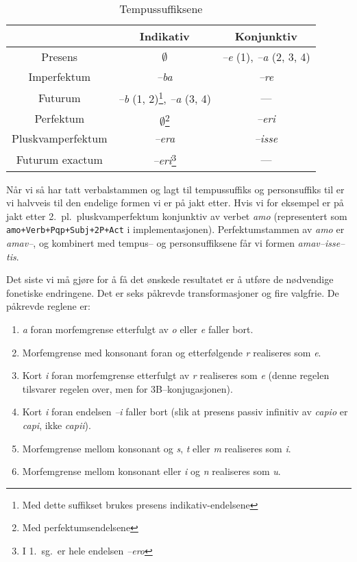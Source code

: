 \documentclass[a4paper]{article}
\begin{document}
\begin{savenotes}
\begin{table}[hp]
\begin{center}
\begin{tabular}{|c|c|c|}
    \hline
                  & Indikativ   & Konjunktiv \\
    \hline
Presens           & $\emptyset$ & \emph{--e} (1), \emph{--a} (2, 3, 4) \\
Imperfektum       & \emph{--ba} & \emph{--re} \\
Futurum           & \emph{--b} (1, 2)\footnote{Med dette suffikset brukes
presens indikativ-endelsene}, \emph{--a} (3, 4) & --- \\
    \hline
Perfektum         & $\emptyset$\footnote{Med perfektumsendelsene} & \emph{--eri} \\
Pluskvamperfektum & \emph{--era} & \emph{--isse} \\
Futurum exactum   & \emph{--eri}\footnote{I 1.~sg.~er hele endelsen
\emph{--ero}} & ---        \\
    \hline
\end{tabular}
\caption{Tempussuffiksene}
\label{tempus}
\end{center}
\end{table}
\end{savenotes}

N\aa{}r vi s\aa{} har tatt verbalstammen og lagt til tempussuffiks og
personsuffiks til er vi halvveis til den endelige formen vi er p\aa{} jakt
etter. Hvis vi for eksempel er p\aa{} jakt etter 2.~pl.~pluskvamperfektum
konjunktiv av verbet \emph{amo} (representert som
\texttt{amo+Verb+Pqp+Subj+2P+Act} i implementasjonen). Perfektumstammen av
\emph{amo} er \emph{amav--}, og kombinert med tempus-- og personsuffiksene
f\aa{}r vi formen \emph{amav--isse--tis}.

Det siste vi m\aa{} gj\o{}re for \aa{} f\aa{} det \o{}nskede resultatet er
\aa{} utf\o{}re de n\o{}dvendige fonetiske endringene. Det er seks
p\aa{}krevde transformasjoner og fire valgfrie. De p\aa{}krevde reglene er:
\begin{enumerate}
\item \emph{a} foran morfemgrense etterfulgt av \emph{o} eller \emph{e} faller
bort.

\item Morfemgrense med konsonant foran og etterf\o{}lgende \emph{r} realiseres
som \emph{e}.

\item Kort \emph{i} foran morfemgrense etterfulgt av \emph{r} realiseres som
\emph{e} (denne regelen tilsvarer regelen over, men for 3B--konjugasjonen).

\item Kort \emph{i} foran endelsen \emph{--i} faller bort (slik at presens
passiv infinitiv av \emph{capio} er \emph{capi}, ikke \emph{capii}).

\item Morfemgrense mellom konsonant og \emph{s}, \emph{t} eller \emph{m}
realiseres som \emph{i}.

\item Morfemgrense mellom konsonant eller \emph{i} og \emph{n} realiseres som
\emph{u}.
\end{enumerate}
\end{document}
